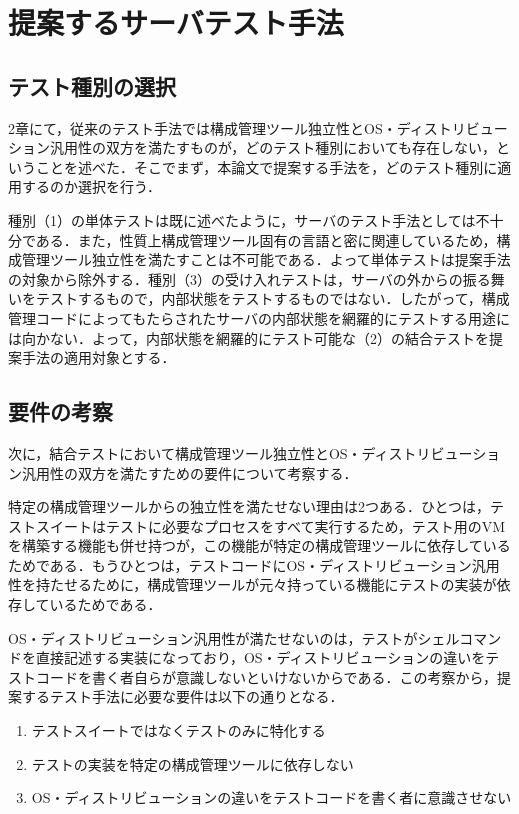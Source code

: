 \section{提案するサーバテスト手法}

\subsection{テスト種別の選択}

2章にて，従来のテスト手法では構成管理ツール独立性とOS・ディストリビューション汎用性の双方を満たすものが，どのテスト種別においても存在しない，ということを述べた．そこでまず，本論文で提案する手法を，どのテスト種別に適用するのか選択を行う．

種別（1）の単体テストは既に述べたように，サーバのテスト手法としては不十分である．また，性質上構成管理ツール固有の言語と密に関連しているため，構成管理ツール独立性を満たすことは不可能である．よって単体テストは提案手法の対象から除外する．種別（3）の受け入れテストは，サーバの外からの振る舞いをテストするもので，内部状態をテストするものではない．したがって，構成管理コードによってもたらされたサーバの内部状態を網羅的にテストする用途には向かない．よって，内部状態を網羅的にテスト可能な（2）の結合テストを提案手法の適用対象とする．

\subsection{要件の考察}

次に，結合テストにおいて構成管理ツール独立性とOS・ディストリビューション汎用性の双方を満たすための要件について考察する．

特定の構成管理ツールからの独立性を満たせない理由は2つある．ひとつは，テストスイートはテストに必要なプロセスをすべて実行するため，テスト用のVMを構築する機能も併せ持つが，この機能が特定の構成管理ツールに依存しているためである．もうひとつは，テストコードにOS・ディストリビューション汎用性を持たせるために，構成管理ツールが元々持っている機能にテストの実装が依存しているためである．

OS・ディストリビューション汎用性が満たせないのは，テストがシェルコマンドを直接記述する実装になっており，OS・ディストリビューションの違いをテストコードを書く者自らが意識しないといけないからである．この考察から，提案するテスト手法に必要な要件は以下の通りとなる．

\begin{enumerate}
  \item テストスイートではなくテストのみに特化する
  \item テストの実装を特定の構成管理ツールに依存しない
  \item OS・ディストリビューションの違いをテストコードを書く者に意識させない
\end{enumerate}

